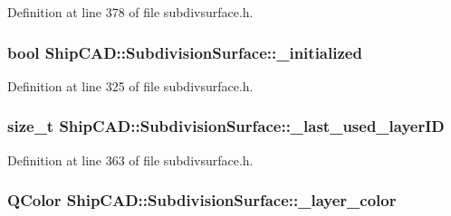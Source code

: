 Definition at line 378 of file subdivsurface.\-h.

\hypertarget{classShipCAD_1_1SubdivisionSurface_a828f85ee49e1481e95f61b919070842c}{
\subsubsection[{\-\_\-initialized}]{\setlength{\rightskip}{0pt plus 5cm}bool Ship\-C\-A\-D\-::\-Subdivision\-Surface\-::\-\_\-initialized\hspace{0.3cm}{\ttfamily [protected]}}}\label{classShipCAD_1_1SubdivisionSurface_a828f85ee49e1481e95f61b919070842c}


Definition at line 325 of file subdivsurface.\-h.

\hypertarget{classShipCAD_1_1SubdivisionSurface_a0ba5c4e08110400890eb60140f3e2058}{
\subsubsection[{\-\_\-last\-\_\-used\-\_\-layer\-I\-D}]{\setlength{\rightskip}{0pt plus 5cm}size\-\_\-t Ship\-C\-A\-D\-::\-Subdivision\-Surface\-::\-\_\-last\-\_\-used\-\_\-layer\-I\-D\hspace{0.3cm}{\ttfamily [protected]}}}\label{classShipCAD_1_1SubdivisionSurface_a0ba5c4e08110400890eb60140f3e2058}


Definition at line 363 of file subdivsurface.\-h.

\hypertarget{classShipCAD_1_1SubdivisionSurface_a0833012e177dfd6cdb71174cb7baed17}{
\subsubsection[{\-\_\-layer\-\_\-color}]{\setlength{\rightskip}{0pt plus 5cm}Q\-Color Ship\-C\-A\-D\-::\-Subdivision\-Surface\-::\-\_\-layer\-\_\-color\hspace{0.3cm}{\ttfamily [protected]}}}\label{classShipCAD_1_1SubdivisionSurface_a0833012e177dfd6cdb71174cb7baed17}


